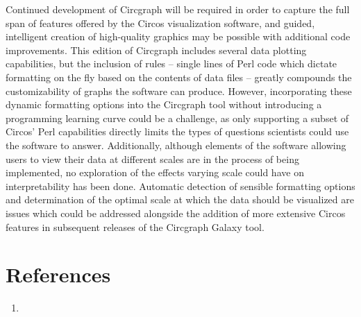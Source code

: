 \documentclass{article}
\begin{document}
Continued development of Circgraph will be required in order to capture the full span of features offered by the Circos visualization software, and guided, intelligent creation of high-quality graphics may be possible with additional code improvements. This edition of Circgraph includes several data plotting capabilities, but the inclusion of rules -- single lines of Perl code which dictate formatting on the fly based on the contents of data files -- greatly compounds the customizability of graphs the software can produce. However, incorporating these dynamic formatting options into the Circgraph tool without introducing a programming learning curve could be a challenge, as only supporting a subset of Circos' Perl capabilities directly limits the types of questions scientists could use the software to answer. Additionally, although elements of the software allowing users to view their data at different scales are in the process of being implemented, no exploration of the effects varying scale could have on interpretability has been done. Automatic detection of sensible formatting options and determination of the optimal scale at which the data should be visualized are issues which could be addressed alongside the addition of more extensive Circos features in subsequent releases of the Circgraph Galaxy tool.

\section*{References}
\begin{enumerate}
\item
\end{enumerate}
\end{document}
